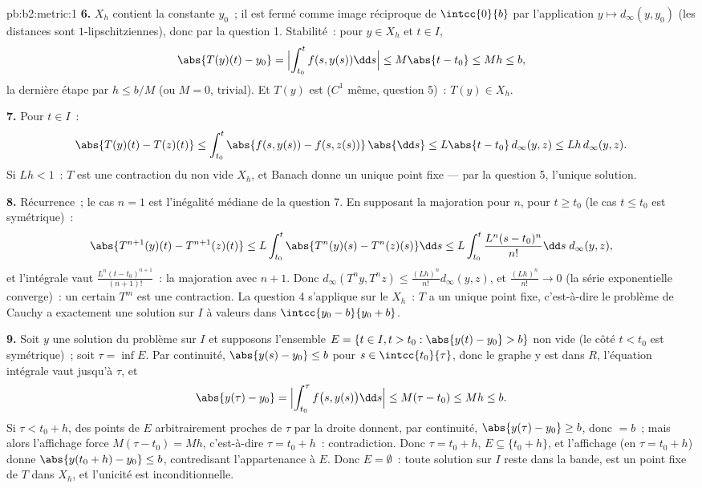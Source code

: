 \begin{solution}{pb:b2:metric:1}
\textbf{6.} $X_h$ contient la constante $y_0$~; il est fermé comme
image réciproque de $\intcc{0}{b}$ par l'application  $y
\mapsto d_\infty(y, y_0)$ (les distances sont $1$-lipschitziennes),
donc  par la question 1. Stabilité~: pour $y \in X_h$ et $t
\in I$,
\[
\abs{T(y)(t) - y_0} = \Bigl|\int_{t_0}^{t}f(s, y(s))\dd s\Bigr|
\leq M\abs{t - t_0} \leq Mh \leq b ,
\]
la dernière étape par $h \leq b/M$ (ou $M = 0$, trivial). Et $T(y)$
est  ($C^1$ même, question 5)~: $T(y) \in X_h$.

\textbf{7.} Pour $t \in I$~:
\[
\abs{T(y)(t) - T(z)(t)} \leq \int_{t_0}^{t}\abs{f(s, y(s)) -
f(s, z(s))}\,\abs{\dd s} \leq L\abs{t - t_0}\,d_\infty(y,z)
\leq Lh\,d_\infty(y,z).
\]
Si $Lh < 1$~: $T$ est une contraction du  non vide $X_h$, et
Banach donne un unique point fixe --- par la question 5, l'unique
solution.

\textbf{8.} Récurrence~; le cas $n = 1$ est l'inégalité médiane de la
question 7. En supposant la majoration pour $n$, pour $t \geq t_0$
(le cas $t \leq t_0$ est symétrique)~:
\[
\abs{T^{n+1}(y)(t) - T^{n+1}(z)(t)}
\leq L\int_{t_0}^{t}\abs{T^n(y)(s) - T^n(z)(s)}\dd s
\leq L\int_{t_0}^{t}\frac{L^n(s - t_0)^n}{n!}\dd s\;
d_\infty(y,z),
\]
et l'intégrale vaut $\frac{L^n(t - t_0)^{n+1}}{(n+1)!}$~: la
majoration avec $n + 1$. Donc $d_\infty(T^n y, T^n z) \leq
\frac{(Lh)^n}{n!}d_\infty(y, z)$, et $\frac{(Lh)^n}{n!} \to 0$ (la
série exponentielle converge)~: un certain $T^m$ est une contraction.
La question 4 s'applique sur le  $X_h$~: $T$ a un unique point
fixe, c'est-à-dire le problème de Cauchy a exactement une solution
sur $I$ à valeurs dans $\intcc{y_0 - b}{y_0 + b}$.

\textbf{9.} Soit $y$ une solution du problème sur $I$ et supposons
l'ensemble $E = \{t \in I, t > t_0 : \abs{y(t) - y_0} > b\}$ non vide
(le côté $t < t_0$ est symétrique)~; soit $\tau = \inf E$. Par
continuité, $\abs{y(s) - y_0} \leq b$ pour $s \in \intcc{t_0}{\tau}$,
donc le graphe y est dans $R$, l'équation intégrale vaut jusqu'à
$\tau$, et
\[
\abs{y(\tau) - y_0} = \Bigl|\int_{t_0}^{\tau}f\bigl(s,
y(s)\bigr)\dd s\Bigr| \leq M(\tau - t_0) \leq Mh \leq b .
\]
Si $\tau < t_0 + h$, des points de $E$ arbitrairement proches de
$\tau$ par la droite donnent, par continuité, $\abs{y(\tau) - y_0}
\geq b$, donc $= b$~; mais alors l'affichage force $M(\tau - t_0) =
Mh$, c'est-à-dire $\tau = t_0 + h$~: contradiction. Donc $\tau = t_0
+ h$, $E \subseteq \{t_0 + h\}$, et l'affichage (en $\tau = t_0 + h$)
donne $\abs{y(t_0 + h) - y_0} \leq b$, contredisant l'appartenance à
$E$. Donc $E = \emptyset$~: toute solution sur $I$ reste dans la
bande, est un point fixe de $T$ dans $X_h$, et l'unicité est
inconditionnelle.


\end{solution}
